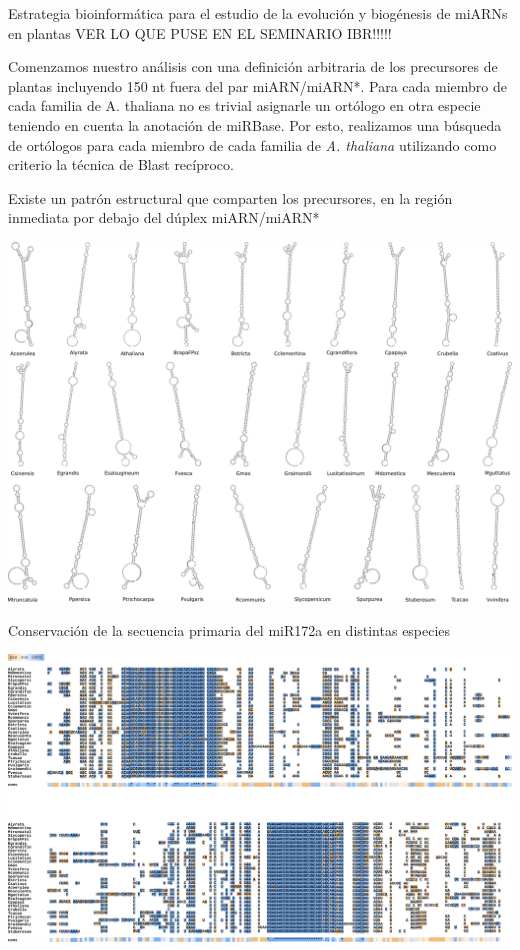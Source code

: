 \documentclass{beamer}
\begin{document}
\begin{frame}{Estrategia bioinformática para el estudio de la evolución y biogénesis de miARNs en plantas}
VER LO QUE PUSE EN EL SEMINARIO IBR!!!!!

    Comenzamos nuestro análisis con una definición arbitraria de los precursores de plantas incluyendo 150 nt fuera del par miARN/miARN*.
    Para cada miembro de cada familia de A. thaliana no es trivial asignarle un ortólogo en otra especie teniendo en cuenta la anotación de miRBase. 
    Por esto, realizamos una búsqueda de ortólogos para cada miembro de cada familia de \textit{A. thaliana} utilizando como criterio la técnica de Blast recíproco.
\end{frame}


\begin{frame}{Existe un patrón estructural que comparten los precursores, en la región inmediata por debajo del dúplex miARN/miARN*}
	\begin{center}
		\includegraphics[width=.9\textwidth]{img/miR172a_rnafold.png}
	\end{center}
\end{frame}


\begin{frame}{Conservación de la secuencia primaria del miR172a en distintas especies}
	\begin{center}
		\includegraphics[width=1\textwidth]{img/miR172a_tcoffee_01.png}
	\end{center}
\end{frame}
\end{document}
